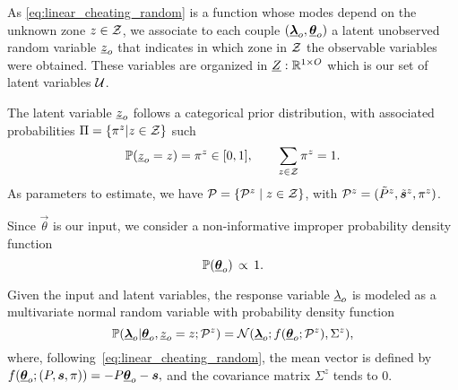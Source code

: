 \documentclass{ifacconf}  %
\begin{document}
As \eqref{eq:linear_cheating_random} is a \pwa{} function whose modes depend on the unknown zone ${z\in\mathcal{Z}}$,
we associate to each couple $(    {\underline{\boldsymbol{\lambda}}}_{o}, {\underline{\boldsymbol{\theta}}}_{o})$ a latent unobserved random variable ${\underline{z}_{o}}$ that indicates in which zone in $\mathcal{Z}$ the observable variables were obtained.
These variables are organized in ${\underline{Z}:\mathbb{R}^{1\times O}}$ which is our set of latent variables $\mathcal{U}$.

The latent variable $\underline{z}_{o}$ follows a categorical prior distribution, with associated probabilities ${\Pi=\{\pi^{z}|z\in\mathcal{Z}\}}$ such
\[\mathbb{P}(\underline{z}_{o}=z)=\pi^{z} \in [0,1], \qquad \sum_{z\in\mathcal{Z}} \pi^{z} = 1.
\]
As parameters to estimate, we have ${\mathcal{P}=\{\mathcal{P}^{z}\mid z\in\mathcal{Z}\}}$, with ${\mathcal{P}^{z}=(\tilde{P}^{z},\tilde{\boldsymbol{s}}^{z},\pi^{z})}$.

Since $\vec{\theta}$ is our input, we consider a non-informative improper probability density function~\citep{ChristensenEtAl2010}
\[
  \mathbb{P}({\underline{\boldsymbol{\theta}}}_{o}) \,\propto \,1.
\]

Given the input and latent variables, the response variable $\underline{\lambda}_{o}$ is modeled as a multivariate normal random variable with probability density function
\begin{equation}
  \label{eq:multivariate_gaussian}
\mathbb{P}({\underline{\boldsymbol{\lambda}}}_{o}|{\underline{\boldsymbol{\theta}}}_{o},\underline{z}_{o}=z; \mathcal{P}^{z}) = \mathcal{N}({\underline{\boldsymbol{\lambda}}}_{o};f({\underline{\boldsymbol{\theta}}}_{o};\mathcal{P}^{z}),{\Sigma^{z}}),
\end{equation}
where, following~\eqref{eq:linear_cheating_random}, the mean vector is defined by
\({f({\underline{\boldsymbol{\theta}}}_{o};(P,\boldsymbol{s},\pi))=-{P}{\underline{\boldsymbol{\theta}}}_{o}-{\boldsymbol{s}},}\)
and the covariance matrix ${\Sigma^{z}}$ tends to $0$.

\end{document}
